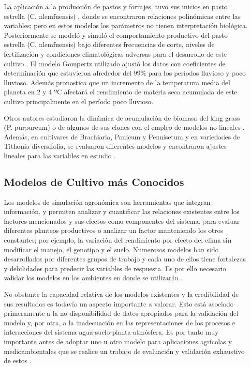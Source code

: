 La aplicación a la producción de pastos y forrajes, tuvo sus inicios en pasto estrella (C. nlemfuensis) \parencite{del1998analisis, torres1999empleo}, donde se encontraron relaciones polinómicas entre las variables; pero en estos modelos los parámetros no tienen interpretación biológica. Posteriormente se modeló y simuló el comportamiento productivo del pasto estrella (C. nlemfuensis) bajo diferentes frecuencias de corte, niveles de fertilización y condiciones climatológicas adversas para el desarrollo de este cultivo \parencite{rodriguez2020modelacion}. El modelo Gompertz utilizado ajustó los datos con coeficientes de determinación que estuvieron alrededor del $99 \% $ para los períodos lluvioso y poco lluvioso. Además pronostica que un incremento de la temperatura media del planeta en 2 y 4 ºC afectará el rendimiento de materia seca acumulada de este cultivo principalmente en el período poco lluvioso. \parencite{rodriguez2018aplicaciones}

Otros autores estudiaron la dinámica de acumulación de biomasa del king grass (P. purpureum) o de algunos de sus clones con el empleo de modelos no lineales \parencite{diaz2007evaluacion, noda2013modelacion}. Además, en cultivares de Brachiaria, Panicum y Pennisetum y en variedades de Tithonia diversifolia, se evaluaron diferentes modelos y encontraron ajustes lineales para las variables en estudio \parencite{ramirez2012rendimiento, torres2012utilizacion, rodriguez2018aplicaciones}.

\subsection{Modelos de Cultivo más Conocidos}

Los modelos de simulación agronómica son herramientas que integran información, y permiten analizar y cuantificar las relaciones existentes entre los factores mencionados y sus efectos como componentes del sistema, para evaluar diferentes planteos productivos o analizar un factor manteniendo los otros constantes; por ejemplo, la variación del rendimiento por efecto del clima sin modificar el manejo, el genotipo y el suelo. Numerosos modelos han sido desarrollados por diferentes grupos de trabajo y cada uno de ellos tiene fortalezas y debilidades para predecir las variables de respuesta. Es por ello necesario validar los modelos en los ambientes en donde se utilizarán \parencite{salvagiotti2003analisis}.

No obstante la capacidad relativa de los modelos existentes y la credibilidad de sus resultados es todavía un aspecto importante a valorar. Esto está asociado primeramente a la no disponibilidad de datos apropiados para la validación del modelo y, por otra, a la inadecuación en las representaciones de los procesos e interacciones del sistema agua-suelo-planta-atmósfera. Es por tanto muy importante antes de adoptar uno u otro modelo para aplicaciones agrícolas y medioambientales que se realice un trabajo de evaluación y validación exhaustivo de estos \parencite{lopez20143}.\\


